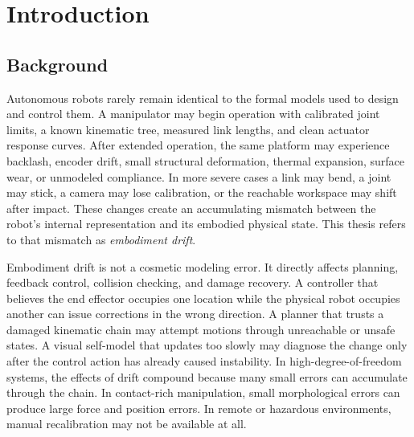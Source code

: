 \documentclass[12pt,a4paper,oneside]{report}
\begin{document}
\tableofcontents
\listoffigures
\listoftables
\clearpage
{}

\chapter{Introduction}

\section{Background}

Autonomous robots rarely remain identical to the formal models used to design and control them. A manipulator may begin operation with calibrated joint limits, a known kinematic tree, measured link lengths, and clean actuator response curves. After extended operation, the same platform may experience backlash, encoder drift, small structural deformation, thermal expansion, surface wear, or unmodeled compliance. In more severe cases a link may bend, a joint may stick, a camera may lose calibration, or the reachable workspace may shift after impact. These changes create an accumulating mismatch between the robot's internal representation and its embodied physical state. This thesis refers to that mismatch as \emph{embodiment drift}.

Embodiment drift is not a cosmetic modeling error. It directly affects planning, feedback control, collision checking, and damage recovery. A controller that believes the end effector occupies one location while the physical robot occupies another can issue corrections in the wrong direction. A planner that trusts a damaged kinematic chain may attempt motions through unreachable or unsafe states. A visual self-model that updates too slowly may diagnose the change only after the control action has already caused instability. In high-degree-of-freedom systems, the effects of drift compound because many small errors can accumulate through the chain. In contact-rich manipulation, small morphological errors can produce large force and position errors. In remote or hazardous environments, manual recalibration may not be available at all.
\end{document}
